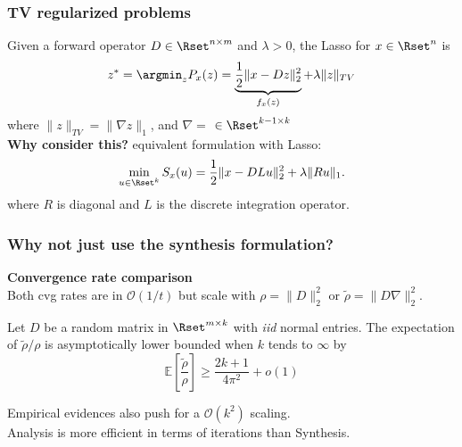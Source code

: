 \documentclass{beamer}
\begin{document}
\begin{frame}
    \frametitle{TV regularized problems}


    Given a forward operator $D \in \Rset^{n\times m}$ and $\lambda > 0$, the Lasso for $x\in \Rset^n$ is \\[.5em]
    \[
    z^{*} = \argmin_{z} P_x(z) =
    \underbrace{\frac{1}{2}\| x - D z\|_2^2}_{f_x(z)}
    + \lambda\| z\|_{TV}
    \]
    where $\|z\|_{TV} = \|\nabla z\|_1$, and $\nabla = $
     $\in \Rset^{k-1\times k}$ \\[2em]

    {\bf Why consider this?} equivalent formulation with Lasso:
    \[
        \min_{u \in \Rset^{k}} S_x(u) = \frac 12 \|x - D L u\|_2^2 + \lambda\|R u\|_1.
    \]
    where $R$ is diagonal and $L$ is the discrete integration operator.\\[1em]

    \strongpoint{}

\end{frame}

\begin{frame}
    \frametitle{Why not just use the synthesis formulation? }


    \textbf{Convergence rate comparison} \\[.5em]

    Both cvg rates are in $\mathcal O(1/t)$ but scale with $\rho = \|D\|_2^2$ or $\widetilde{\rho} = \|D\nabla\|_2^2$.\\[1.5em]

    \begin{theorem}
        Let $D$ be a random matrix in $\Rset^{m\times k}$ with \emph{iid} normal entries. The expectation of $\widetilde \rho/ \rho$ is asymptotically lower bounded when $k$ tends to $\infty$ by
        \[
            \mathbb E\left[\frac{\widetilde \rho}{\rho}\right] \ge
                \frac{2k + 1}{4\pi^2} + o(1)
        \]
    \end{theorem}

    Empirical evidences also push for a $\mathcal O(k^2)$ scaling.\\[2em]

    Analysis is more efficient in terms of iterations than Synthesis.

\end{frame}
\end{document}

